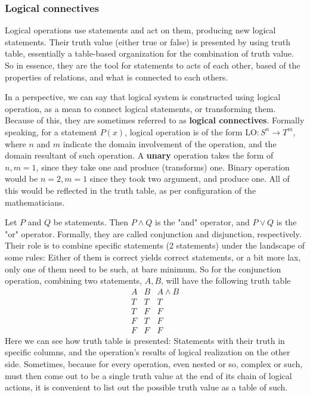 \subsubsection{Logical connectives}
Logical operations use statements and act on them, producing new logical statements. Their truth value (either true or false) is presented by using truth table, essentially a table-based organization for the combination of truth value. So in essence, they are the tool for statements to acts of each other, based of the properties of relations, and what is connected to each others. 

In a perspective, we can say that  logical system is constructed using  logical operation, as a mean to connect logical statements, or transforming them. Because of this, they are sometimes referred to as \textbf{logical connectives}. Formally speaking, for a statement $P(x)$, logical operation is of the form $\mathrm{LO}: S^{n}\to T^m$, where $n$ and $m$ indicate the domain involvement of the operation, and the domain resultant of such operation. A \textbf{unary} operation takes the form of $n,m=1$, since they take one and produce (transforms) one. Binary operation would be $n=2, m =1$ since they took two argument, and produce one. All of this would be reflected in the truth table, as per configuration of the mathematicians. 

Let $P$ and $Q$ be statements. Then $P\land Q$ is the "and" operator, and $P\lor Q$ is the "or" operator. Formally, they are called  conjunction and  disjunction, respectively. Their role is to combine specific statements (2 statements) under the landscape of some rules: Either of them is correct yields correct statements, or a bit more lax, only one of them need to be such, at bare minimum. So for the conjunction operation, combining two statements, $A,B$, will have the following truth table 
$$\begin{array}{|c|c|c|}
    A & B & A\land B \\
    T & T  & T \\
    T  & F  & F \\
    F  & T  & F \\
    F  & F & F 
\end{array}$$
Here we can see how truth table is presented: Statements with their truth in specific columns, and the operation's results of logical realization on the other side. Sometimes, because for every operation, even nested or so, complex or such, must then come out to be a single truth value at the end of its chain of logical actions, it is convenient to list out the possible truth value as a table of such. 

